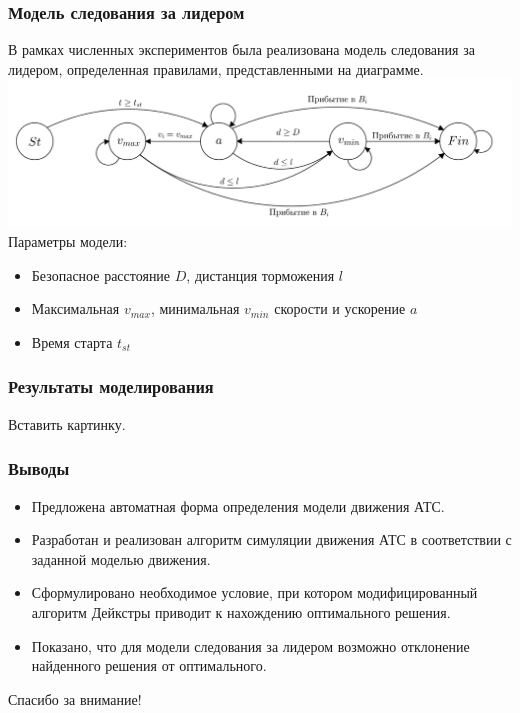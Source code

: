\documentclass{beamer}
\begin{document}
\begin{frame}\frametitle{Модель следования за лидером}
  В рамках численных экспериментов была реализована модель следования за лидером, определенная правилами, представленными на диаграмме.
  \includegraphics[width=\textwidth]{Micro-gen.png}
  Параметры модели: \\
  \begin{itemize}
  	\item Безопасное расстояние $D$, дистанция торможения $l$
  	\item Максимальная $v_{max}$, минимальная $v_{min}$ скорости и ускорение $a$
  	\item Время старта $t_{st}$
  \end{itemize}
\end{frame}


\begin{frame}\frametitle{Результаты моделирования}
  Вставить картинку.
\end{frame}



\begin{frame}\frametitle{Выводы}
  \begin{itemize}
  \item Предложена автоматная форма определения модели движения АТС.
  \item Разработан и реализован алгоритм симуляции движения АТС в соответствии с заданной моделью движения.
  \item Сформулировано необходимое условие, при котором модифицированный алгоритм Дейкстры приводит к нахождению оптимального решения.
  \item Показано, что для модели следования за лидером возможно отклонение найденного решения от оптимального.
  \end{itemize}
\end{frame}


\begin{frame}[standout]
Спасибо за внимание!
\end{frame}
\end{document}
